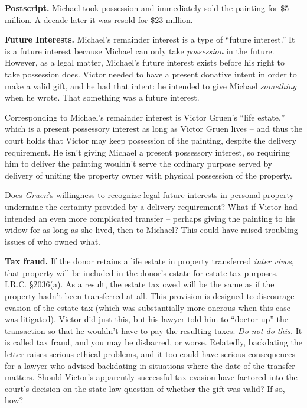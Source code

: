 
\item \textbf{Postscript.} Michael took possession and immediately sold the
painting for \$5 million.  A decade later it was resold for \$23 million.


\item \textbf{Future Interests.}  Michael's remainder interest is a type of
``future interest.''  It is a future interest because Michael can only take
\textit{possession} in the future.  However, as a legal matter, Michael's
future interest exists before his right to take possession does.  Victor needed
to have a present donative intent in order to make a valid gift, and he had
that intent: he intended to give Michael \textit{something} when he wrote. 
That something was a future interest.


Corresponding to Michael's remainder interest is Victor Gruen's ``life estate,''
which is a present possessory interest as long as Victor Gruen lives -- and
thus the court holds that Victor may keep possession of the painting, despite
the delivery requirement.  He isn't giving Michael a present possessory
interest, so requiring him to deliver the painting wouldn't serve the ordinary
purpose served by delivery of uniting the property owner with physical
possession of the property.



Does \textit{Gruen}{}'s willingness to recognize legal future interests in
personal property undermine the certainty provided by a delivery requirement? 
What if Victor had intended an even more complicated transfer -- perhaps giving
the painting to his widow for as long as she lived, then to Michael?  This
could have raised troubling issues of who owned what.



\item \textbf{Tax fraud.}  If the donor retains a life estate in property
transferred \textit{inter vivos}, that property will be included in the donor's
estate for estate tax purposes.  I.R.C. {\S}2036(a).  As a result, the estate
tax owed will be the same as if the property hadn't been transferred at all. 
This provision is designed to discourage evasion of the estate tax (which was
substantially more onerous when this case was litigated).  Victor did just
this, but his lawyer told him to ``doctor up'' the transaction so that he
wouldn't have to pay the resulting taxes.  \textit{Do not do this.}  It is
called tax fraud, and you may be disbarred, or worse.  Relatedly, backdating
the letter raises serious ethical problems, and it too could have serious
consequences for a lawyer who advised backdating in situations where the date
of the transfer matters. Should Victor's apparently successful tax evasion have
factored into the court's decision on the state law question of whether the
gift was valid?  If so, how?  


